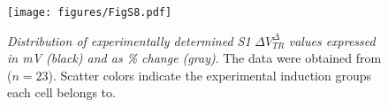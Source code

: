 \begin{figure}[H]
    \centering
    \texttt{[image: figures/FigS8.pdf]}
    \caption{
    \textit{Distribution of experimentally determined S1}
        $\Delta V_{TR}^{\Delta}$
        \textit{values expressed in mV (black) and as \% change (gray)}.
    The data were obtained from \cite{Gill2020-wy} ($n=23$).
    Scatter colors indicate the experimental induction groups each cell belongs to.
    }
    \label{supp:s1-data-dV_TR}
\end{figure}
